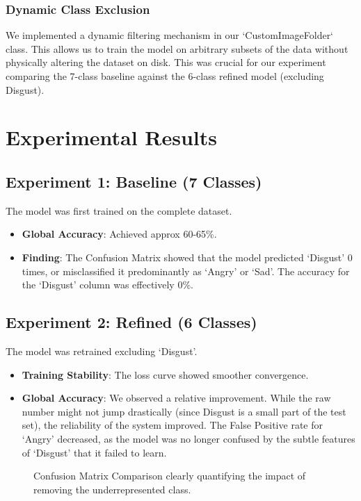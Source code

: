 \documentclass[a4paper,12pt]{article}
\begin{document}
\subsubsection{Dynamic Class Exclusion}
We implemented a dynamic filtering mechanism in our `CustomImageFolder` class. This allows us to train the model on arbitrary subsets of the data without physically altering the dataset on disk. This was crucial for our experiment comparing the 7-class baseline against the 6-class refined model (excluding Disgust).

\section{Experimental Results}

\subsection{Experiment 1: Baseline (7 Classes)}
The model was first trained on the complete dataset.
\begin{itemize}
    \item \textbf{Global Accuracy}: Achieved approx 60-65\%.
    \item \textbf{Finding}: The Confusion Matrix showed that the model predicted `Disgust' 0 times, or misclassified it predominantly as `Angry' or `Sad'. The accuracy for the `Disgust' column was effectively 0\%.
\end{itemize}

\subsection{Experiment 2: Refined (6 Classes)}
The model was retrained excluding `Disgust'.
\begin{itemize}
    \item \textbf{Training Stability}: The loss curve showed smoother convergence.
    \item \textbf{Global Accuracy}: We observed a relative improvement. While the raw number might not jump drastically (since Disgust is a small part of the test set), the reliability of the system improved. The False Positive rate for `Angry' decreased, as the model was no longer confused by the subtle features of `Disgust' that it failed to learn.
\end{itemize}

\begin{figure}[H]
    \centering
    \hfill
    \caption{Confusion Matrix Comparison clearly quantifying the impact of removing the underrepresented class.}
    \label{fig:cm_compare}
\end{figure}
\end{document}
